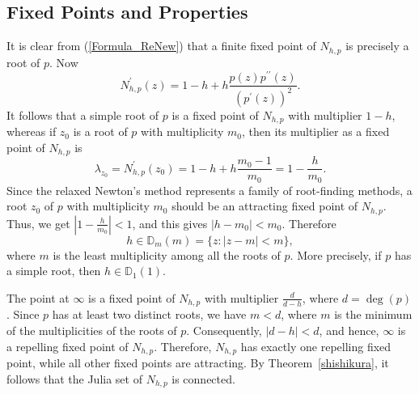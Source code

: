 \documentclass[12pt]{article}
\numberwithin{equation}{section}
\begin{document}
\subsection{Fixed Points and Properties}
It is clear from (\ref{Formula_ReNew}) that a finite fixed point of $N_{h,p}$ is precisely a root of $p$. Now
$$
N_{h, p}^{\prime}(z)=1-h+h \frac{p(z) p^{\prime \prime}(z)}{\left(p^{\prime}(z)\right)^{2}}. 
$$
It follows that a simple root of $p$ is a fixed point of $N_{h, p}$ with multiplier $1-h$, whereas if $z_{0}$ is a root of $p$ with multiplicity $m_{0}$, then its multiplier as a fixed point of $N_{h,p}$ is
$$
\lambda_{z_{0}}=N_{h, p}^{\prime}\left(z_{0}\right) =1-h+h \frac{m_{0}-1}{m_{0}}=1-\frac{h}{m_{0}}.$$
Since the relaxed Newton's method represents a family of root-finding methods, a root $z_{0}$ of $p$ with multiplicity $m_{0}$ should be an attracting fixed point of $N_{h, p}$. Thus, we get  $\left|1-\frac{h}{m_{0}}\right|<1$, and this gives $\left|h-m_{0}\right|<m_{0}$.
Therefore 
$$h \in \mathbb{D}_{m}(m)=\{z:|z-m|<m\},$$ 
where $m$ is the least multiplicity among all the roots of $p$. More precisely, if $p$ has a simple root, then $h \in \mathbb{D}_{1}(1)$.
\par 
The point at $\infty$ is a fixed point of $N_{h,p}$ with multiplier $\frac{d}{d-h}$, where $d=\deg(p)$. Since $p$ has at least two distinct roots, we have $m<d$, where $m$ is the minimum of the multiplicities of the roots of $p$. Consequently, $|d-h|<d$, and hence, $\infty$ is a repelling fixed point of $N_{h,p}$. Therefore, $N_{h,p}$ has exactly one repelling fixed point, while all other fixed points are attracting. By Theorem~\ref{shishikura}, it follows that the Julia set of $N_{h,p}$ is connected.
\end{document}
